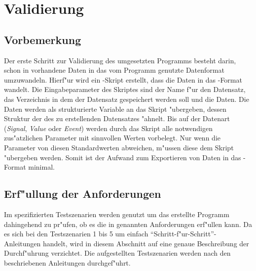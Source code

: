 \chapter{Validierung}
\label{chap:validierung}

\section{Vorbemerkung}
\label{sec:validierung_vorbereitung}

Der erste Schritt zur Validierung des umgesetzten Programms besteht darin, schon in \ml vorhandene Daten in das vom Programm genutzte Datenformat umzuwandeln.
Hierf"ur wird ein \mlNS-Skript erstellt, dass die Daten in das \usNS-Format wandelt.
Die Eingabeparameter des Skriptes sind der Name f"ur den Datensatz, das Verzeichnis in dem der Datensatz gespeichert werden soll und die Daten.
Die Daten werden als strukturierte Variable an das Skript "ubergeben, dessen Struktur der des zu erstellenden Datensatzes "ahnelt.
Bis auf der Datenart (\emph{Signal}, \emph{Value} oder \emph{Event}) werden durch das Skript alle notwendigen zus"atzlichen Parameter mit sinnvollen Werten vorbelegt.
Nur wenn die Parameter von diesen Standardwerten abweichen, m"ussen diese dem Skript "ubergeben werden.
Somit ist der Aufwand zum Exportieren von Daten in das \usNS-Format minimal.


\section{Erf"ullung der Anforderungen}
\label{sec:anforderungsvalidierung}

Im  spezifizierten Testszenarien werden genutzt um das erstellte Programm dahingehend zu pr"ufen, ob es die in  genannten Anforderungen erf"ullen kann.
Da es sich bei den Testszenarien 1 bis 5 um einfach "`Schritt-f"ur-Schritt"'-Anleitungen handelt, wird in diesem Abschnitt auf eine genaue Beschreibung der Durchf"uhrung verzichtet.
Die aufgestellten Testszenarien werden nach den beschriebenen Anleitungen durchgef"uhrt.

